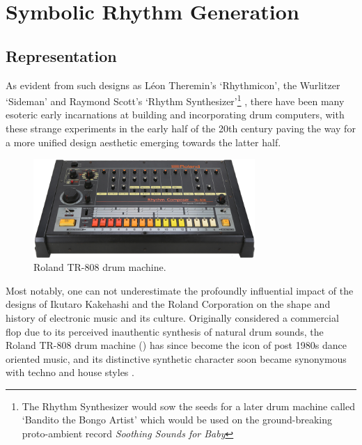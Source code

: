 \section{Symbolic Rhythm Generation}

\subsection{Representation}

As evident from such designs as Léon Theremin's `Rhythmicon', the Wurlitzer `Sideman' and Raymond Scott's `Rhythm Synthesizer'\footnote{The Rhythm Synthesizer would sow the seeds for a later drum machine called `Bandito the Bongo Artist' which would be used on the ground-breaking proto-ambient record \textit{Soothing Sounds for Baby}\citep{Collins2011a}} \citep{Tindale2009, Malmberg2010, Arar2013}, there have been many esoteric early incarnations at building and incorporating drum computers, with these strange experiments in the early half of the 20th century paving the way for a more unified design aesthetic emerging towards the latter half. 

\begin{figure}
	\begin{center}
		\includegraphics[width=0.75\textwidth]{ch03_symbolic/figures/tr-808.png}
	\end{center}
	\caption[Roland TR-808 drum machine]{Roland TR-808 drum machine.}
	\label{fig:tr-808}
\end{figure}


Most notably, one can not underestimate the profoundly influential impact of the designs of Ikutaro Kakehashi and the Roland Corporation on the shape and history of electronic music and its culture. Originally considered a commercial flop due to its perceived inauthentic synthesis of natural drum sounds, the Roland TR-808 drum machine () has since become the icon of post 1980s dance oriented music, and its distinctive synthetic character soon became synonymous with techno and house styles \citep{theberge1997any}.

